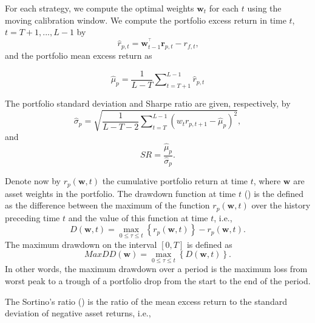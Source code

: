 \documentclass[a4paper,10pt]{article}
\begin{document}
For each strategy, we compute the optimal weights $\mathbf{w}_{t}$ for each $%
t$ using the moving calibration window. We compute the portfolio excess
return in time $t$, $t=T+1,...,L-1$ by
\begin{equation}
\widehat{r}_{p,t}=\mathbf{w}_{t-1}^{^{\top }}\mathbf{r}_{p,t}-r_{f,t}\text{,}
\end{equation}%
and the portfolio mean excess return as

\begin{equation}
\widehat{\mu }_{p}=\frac{1}{L-T}\sum\nolimits_{t=T+1}^{L-1}\widehat{r}_{p,t}
\end{equation}

\bigskip The portfolio standard deviation and Sharpe ratio are given,
respectively, by
\begin{equation}
\widehat{\sigma }_{p}=\sqrt{\frac{1}{L-T-2}\sum\nolimits_{t=T}^{L-1}\left(
	w_{t}r_{p,t+1}-\widehat{\mu }_{p}\right) ^{2}},
\end{equation}%
and
\begin{equation}
SR=\frac{\widehat{\mu }_{p}}{\widehat{\sigma }_{p}}.
\end{equation}

\bigskip

Denote now by $r_{p}\left( \mathbf{w,}t\right) $ the cumulative portfolio
return at time $t$, where $\mathbf{w}$ are asset weights in the portfolio.
The drawdown function at time $t$ (\citet*{unger2014}) is the defined as the
difference between the maximum of the function $r_{p}\left( \mathbf{w,}%
t\right) $ over the history preceding time $t$ and the value of this
function at time $t$, i.e.,
\begin{equation}
D\left( \mathbf{w,}t\right) =\underset{0\leq \tau \leq t}{\max }\left\{
r_{p}\left( \mathbf{w,}t\right) \right\} -r_{p}\left( \mathbf{w,}t\right) .
\end{equation}%
The maximum drawdown on the interval $[0,T]$ is defined as
\begin{equation}
MaxDD\left( \mathbf{w}\right) =\underset{0\leq \tau \leq t}{\max }\left\{
D\left( \mathbf{w,}t\right) \right\} .
\end{equation}
In other words, the maximum drawdown over a period is the maximum loss from
worst peak to a trough of a portfolio drop from the start to the end of the
period.

\bigskip

The Sortino's ratio (\citet*{sortino1994}) is the ratio of the mean excess
return to the standard deviation of negative asset returns, i.e.,
\end{document}
